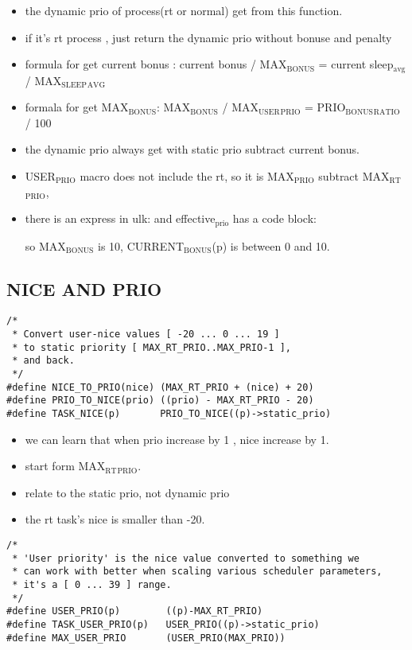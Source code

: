 \documentclass[11pt]{article}
\begin{document}
\begin{itemize}
\item the dynamic prio of process(rt or normal) get from this function.
\item if it's rt process , just return the dynamic prio without bonuse and penalty
\item formula for get current bonus : current bonus / MAX$_{\mathrm{BONUS}}$ = current sleep$_{\mathrm{avg}}$ /
  MAX$_{\mathrm{SLEEP}}$$_{\mathrm{AVG}}$
\item formala for get MAX$_{\mathrm{BONUS}}$: MAX$_{\mathrm{BONUS}}$ / MAX$_{\mathrm{USER}}$$_{\mathrm{PRIO}}$ = PRIO$_{\mathrm{BONUS}}$$_{\mathrm{RATIO}}$ / 100
\item the dynamic prio always get with static prio subtract current bonus.
\item USER$_{\mathrm{PRIO}}$ macro does not include the rt, so it is MAX$_{\mathrm{PRIO}}$ subtract
  MAX$_{\mathrm{RT}}$$_{\mathrm{PRIO}}$,
\item there is an express in ulk:
  and effective$_{\mathrm{prio}}$ has a code block:

   so MAX$_{\mathrm{BONUS}}$ is 10, CURRENT$_{\mathrm{BONUS}}$(p) is between 0 and 10.
\end{itemize}
\subsection{NICE AND PRIO}
\label{sec-3.2}


\begin{verbatim}
/*
 * Convert user-nice values [ -20 ... 0 ... 19 ]
 * to static priority [ MAX_RT_PRIO..MAX_PRIO-1 ],
 * and back.
 */
#define NICE_TO_PRIO(nice) (MAX_RT_PRIO + (nice) + 20)
#define PRIO_TO_NICE(prio) ((prio) - MAX_RT_PRIO - 20)
#define TASK_NICE(p)       PRIO_TO_NICE((p)->static_prio)
\end{verbatim}


\begin{itemize}
\item we can learn that when prio increase by 1 , nice increase by 1.
\item start form MAX$_{\mathrm{RT}}$$_{\mathrm{PRIO}}$.
\item relate to the static prio, not dynamic prio
\item the rt task's nice is smaller than -20.
\end{itemize}
\begin{verbatim}
/*
 * 'User priority' is the nice value converted to something we
 * can work with better when scaling various scheduler parameters,
 * it's a [ 0 ... 39 ] range.
 */
#define USER_PRIO(p)        ((p)-MAX_RT_PRIO)
#define TASK_USER_PRIO(p)   USER_PRIO((p)->static_prio)
#define MAX_USER_PRIO       (USER_PRIO(MAX_PRIO))
\end{verbatim}
\end{document}
